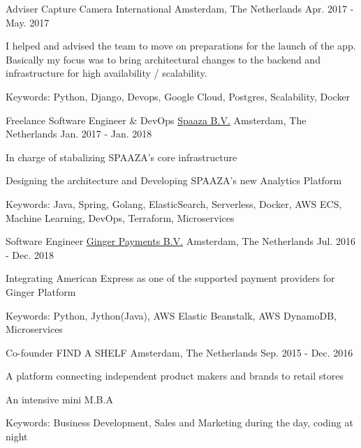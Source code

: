 \begin{cventries}
  \cventry
    {Adviser} %
    {Capture Camera International} %
    {Amsterdam, The Netherlands} %
    {Apr. 2017 - May. 2017} %
    {
    \begin{cvitems} %
      \item {I helped and advised the team to move on preparations for the launch of the app. Basically my focus was to bring architectural changes to the backend and infrastructure for high availability / scalability.}
      \item {Keywords: Python, Django, Devops, Google Cloud, Postgres, Scalability, Docker}
    \end{cvitems}
    }

  \cventry
    {Freelance Software Engineer \& DevOps} %
    {\href{https://www.spaaza.com/}{Spaaza B.V.}} %
    {Amsterdam, The Netherlands} %
    {Jan. 2017 - Jan. 2018} %
    {
      \begin{cvitems} %
        \item {In charge of stabalizing SPAAZA's core infrastructure}
        \item {Designing the architecture and Developing SPAAZA's new Analytics Platform}
        \item {Keywords: Java, Spring, Golang, ElasticSearch, Serverless, Docker, AWS ECS, Machine Learning, DevOps, Terraform, Microservices}
      \end{cvitems}
    }

  \cventry
    {Software Engineer} %
    {\href{https://www.gingerpayments.com/}{Ginger Payments B.V.}} %
    {Amsterdam, The Netherlands} %
    {Jul. 2016 - Dec. 2018} %
    {
      \begin{cvitems} %
        \item {Integrating American Express as one of the supported payment providers for Ginger Platform}
        \item {Keywords: Python, Jython(Java), AWS Elastic Beanstalk, AWS DynamoDB, Microservices}
      \end{cvitems}
    }


  \cventry
  {Co-founder} %
  {FIND A SHELF} %
  {Amsterdam, The Netherlands} %
  {Sep. 2015 - Dec. 2016} %
   {
          \begin{cvitems} %
            \item {A platform connecting independent product makers and brands to retail stores}
            \item {An intensive mini M.B.A}
            \item {Keywords: Business Development, Sales and Marketing during the day, coding at night}
          \end{cvitems}
        }


\end{cventries}
